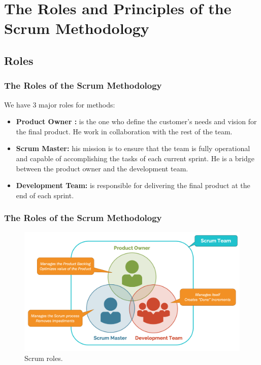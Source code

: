 \documentclass[
	11pt, %
]{beamer}
\begin{document}

\section{The Roles and Principles of the Scrum Methodology}

\subsection{Roles}

\begin{frame}
	\frametitle{The Roles of the Scrum Methodology}
	We have 3 major roles for methods:
	
	\begin{itemize}
		\item \textbf{Product Owner :}
		      \newline
		      is the one who define the customer's needs and
		      vision for the final product. He work in collaboration with the rest of the team.
		\item \textbf{Scrum Master:}
		      \newline
		      his mission is to ensure that the team is fully operational and capable
		      of accomplishing the tasks of each current sprint.
		      He is a bridge between the product owner and the development team.
		\item \textbf{Development Team:}
		      \newline
		      is responsible for delivering the final
		      product at the end of each sprint.
	\end{itemize}

\end{frame}


\begin{frame}
	\frametitle{The Roles of the Scrum Methodology}
	\begin{figure}
		\includegraphics[width=0.8\linewidth]{Role.png}
		\caption{Scrum roles.}
	\end{figure}
\end{frame}
\end{document}

